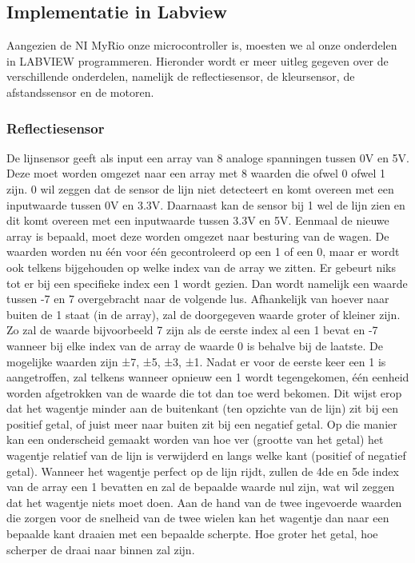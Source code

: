\documentclass[kulak]{kulakarticle} %
\begin{document}
\subsection{Implementatie in Labview}
Aangezien de NI MyRio onze microcontroller is, moesten we al onze onderdelen in LABVIEW programmeren. Hieronder wordt er meer uitleg gegeven over de verschillende onderdelen, namelijk de reflectiesensor, de kleursensor, de afstandssensor en de motoren.
\subsubsection{Reflectiesensor}
De lijnsensor geeft als input een array van 8 analoge spanningen tussen 0V en 5V. Deze moet worden omgezet naar een array met 8 waarden die ofwel 0 ofwel 1 zijn. 0 wil zeggen dat de sensor de lijn niet detecteert en komt overeen met een inputwaarde tussen 0V en 3.3V. Daarnaast kan de sensor bij 1 wel de lijn zien en dit komt overeen met een inputwaarde tussen 3.3V en 5V. Eenmaal de nieuwe array is bepaald, moet deze worden omgezet naar besturing van de wagen. 
De waarden worden nu één voor één gecontroleerd op een 1 of een 0, maar er wordt ook telkens bijgehouden op welke index van de array we zitten. Er gebeurt niks tot er bij een specifieke index een 1 wordt gezien. Dan wordt namelijk een waarde tussen -7 en 7 overgebracht naar de volgende lus. Afhankelijk van hoever naar buiten de 1 staat (in de array), zal de doorgegeven waarde groter of kleiner zijn. Zo zal de waarde bijvoorbeeld 7 zijn als de eerste index al een 1 bevat en -7 wanneer bij elke index van de array de waarde 0 is behalve bij de laatste. De mogelijke waarden zijn ±7, ±5, ±3, ±1. Nadat er voor de eerste keer een 1 is aangetroffen, zal telkens wanneer opnieuw een 1 wordt tegengekomen, één eenheid worden afgetrokken van de waarde die tot dan toe werd bekomen. Dit wijst erop dat het wagentje minder aan de buitenkant (ten opzichte van de lijn) zit bij een positief getal, of juist meer naar buiten zit bij een negatief getal. Op die manier kan een onderscheid gemaakt worden van hoe ver (grootte van het getal) het wagentje relatief van de lijn is verwijderd en langs welke kant (positief of negatief getal). Wanneer het wagentje perfect op de lijn rijdt, zullen de 4de en 5de index van de array een 1 bevatten en zal de bepaalde waarde nul zijn, wat wil zeggen dat het wagentje niets moet doen. Aan de hand van de twee ingevoerde waarden die zorgen voor de snelheid van de twee wielen kan het wagentje dan naar een bepaalde kant draaien met een bepaalde scherpte. Hoe groter het getal, hoe scherper de draai naar binnen zal zijn.
\end{document}
